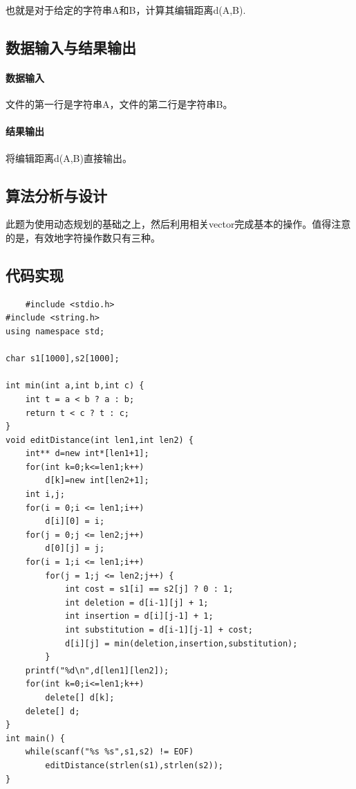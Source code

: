 \documentclass[UTF8]{ctexart}
\begin{document}
    也就是对于给定的字符串A和B，计算其编辑距离d(A,B).

    \subsection{数据输入与结果输出}
    \paragraph{数据输入}
    文件的第一行是字符串A，文件的第二行是字符串B。

    \paragraph{结果输出}
    将编辑距离d(A,B)直接输出。

    \subsection{算法分析与设计}
    此题为使用动态规划的基础之上，然后利用相关vector完成基本的操作。值得注意的是，有效地字符操作数只有三种。

    \subsection{代码实现}
    \begin{small}
    \begin{lstlisting}
    #include <stdio.h>
#include <string.h>
using namespace std;

char s1[1000],s2[1000];

int min(int a,int b,int c) {
    int t = a < b ? a : b;
    return t < c ? t : c;
}
void editDistance(int len1,int len2) {
    int** d=new int*[len1+1];
    for(int k=0;k<=len1;k++)
        d[k]=new int[len2+1];
    int i,j;
    for(i = 0;i <= len1;i++)
        d[i][0] = i;
    for(j = 0;j <= len2;j++)
        d[0][j] = j;
    for(i = 1;i <= len1;i++)
        for(j = 1;j <= len2;j++) {
            int cost = s1[i] == s2[j] ? 0 : 1;
            int deletion = d[i-1][j] + 1;
            int insertion = d[i][j-1] + 1;
            int substitution = d[i-1][j-1] + cost;
            d[i][j] = min(deletion,insertion,substitution);
        }
    printf("%d\n",d[len1][len2]);
    for(int k=0;i<=len1;k++)
        delete[] d[k];
    delete[] d;
}
int main() {
    while(scanf("%s %s",s1,s2) != EOF)
        editDistance(strlen(s1),strlen(s2));
}
    \end{lstlisting}
    \end{small}
\end{document}
